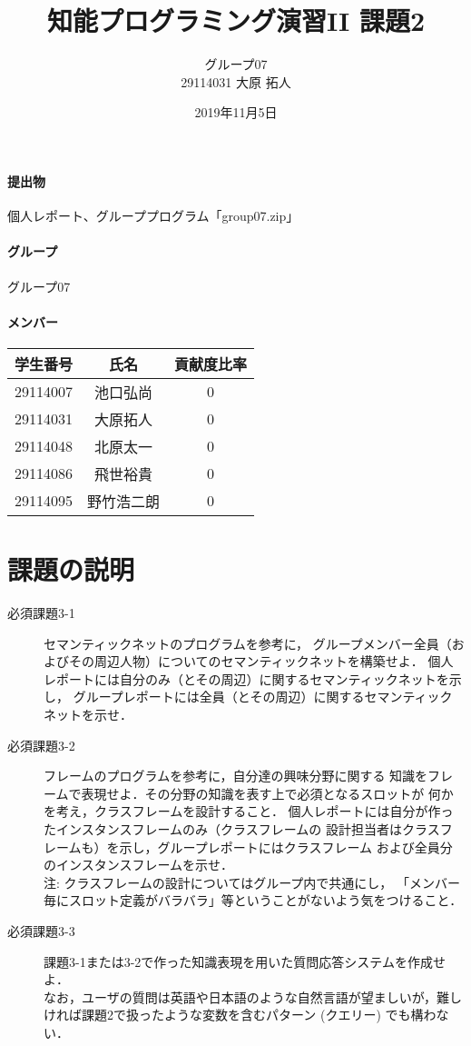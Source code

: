 \documentclass{jarticle}
\title{知能プログラミング演習II 課題2}
\author{グループ07\\
    29114031 大原 拓人\\
}
\date{2019年11月5日}
\begin{document}
\maketitle

\paragraph{提出物} 個人レポート、グループプログラム「group07.zip」
\paragraph{グループ} グループ07
\paragraph{メンバー}
\begin{tabular}{|c|c|c|}
    \hline
    学生番号&氏名&貢献度比率\\
    \hline\hline
    29114007&池口弘尚&0\\
    \hline
    29114031&大原拓人&0\\
    \hline
    29114048&北原太一&0\\
    \hline
    29114086&飛世裕貴&0\\
    \hline
    29114095&野竹浩二朗&0\\
    \hline
\end{tabular}

\section{課題の説明}
\begin{description}
    \item[必須課題3-1] セマンティックネットのプログラムを参考に，
    グループメンバー全員（およびその周辺人物）についてのセマンティックネットを構築せよ．
    個人レポートには自分のみ（とその周辺）に関するセマンティックネットを示し，
    グループレポートには全員（とその周辺）に関するセマンティックネットを示せ．
    \item[必須課題3-2] フレームのプログラムを参考に，自分達の興味分野に関する
    知識をフレームで表現せよ．その分野の知識を表す上で必須となるスロットが
    何かを考え，クラスフレームを設計すること．
    個人レポートには自分が作ったインスタンスフレームのみ（クラスフレームの
    設計担当者はクラスフレームも）を示し，グループレポートにはクラスフレーム
    および全員分のインスタンスフレームを示せ．
    \\ 注: クラスフレームの設計についてはグループ内で共通にし，
    「メンバー毎にスロット定義がバラバラ」等ということがないよう気をつけること．
    \item[必須課題3-3] 課題3-1または3-2で作った知識表現を用いた質問応答システムを作成せよ．
    \\ なお，ユーザの質問は英語や日本語のような自然言語が望ましいが，難しければ課題2で扱ったような変数を含むパターン (クエリー) でも構わない． 
\end{description}
\end{document}

